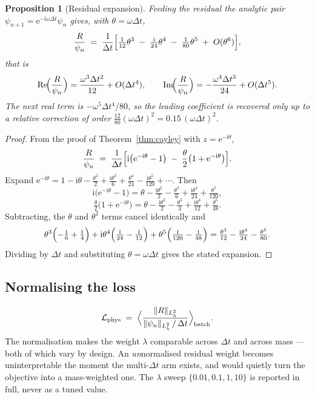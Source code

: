 \documentclass[11pt,a4paper]{article}
\theoremstyle{plain}
\newtheorem{proposition}[theorem]{Proposition}
\theoremstyle{definition}
\theoremstyle{remark}
\newcommand{\iu}{\mathrm{i}}
\newcommand{\eu}{\mathrm{e}}
\newcommand{\dt}{\Delta t}
\DeclareMathOperator{\Imag}{Im}
\DeclareMathOperator{\Real}{Re}
\begin{document}
\begin{proposition}[Residual expansion]
\label{prop:residualexpansion}
Feeding the residual the \emph{analytic} pair $\psi_{n+1} = \eu^{-\iu\omega\dt}\psi_n$
gives, with $\theta = \omega\dt$,
\[
\frac{R}{\psi_n}
\;=\; \frac{1}{\dt}\Bigl[\tfrac{1}{12}\theta^3 \;-\; \tfrac{\iu}{24}\theta^4 \;-\; \tfrac{1}{80}\theta^5 \;+\; O(\theta^6)\Bigr],
\]
that is
\[
\Real\!\Bigl(\frac{R}{\psi_n}\Bigr) = \frac{\omega^3\dt^2}{12} + O(\dt^4),
\qquad
\Imag\!\Bigl(\frac{R}{\psi_n}\Bigr) = -\frac{\omega^4\dt^3}{24} + O(\dt^5).
\]
The next real term is $-\omega^5\dt^4/80$, so the leading coefficient is recovered only up
to a \emph{relative} correction of order $\tfrac{12}{80}(\omega\dt)^2 = 0.15\,(\omega\dt)^2$.
\end{proposition}

\begin{proof}
From the proof of Theorem~\ref{thm:cayley} with $z=\eu^{-\iu\theta}$,
\[
\frac{R}{\psi_n}\;=\;\frac{1}{\dt}\Bigl[\iu\bigl(\eu^{-\iu\theta}-1\bigr) \;-\; \frac{\theta}{2}\bigl(1+\eu^{-\iu\theta}\bigr)\Bigr].
\]
Expand $\eu^{-\iu\theta} = 1 - \iu\theta - \tfrac{\theta^2}{2} + \tfrac{\iu\theta^3}{6} + \tfrac{\theta^4}{24} - \tfrac{\iu\theta^5}{120}+\cdots$. Then
\[
\iu\bigl(\eu^{-\iu\theta}-1\bigr) = \theta - \tfrac{\iu\theta^2}{2} - \tfrac{\theta^3}{6} + \tfrac{\iu\theta^4}{24} + \tfrac{\theta^5}{120},
\]
\[
\tfrac{\theta}{2}\bigl(1+\eu^{-\iu\theta}\bigr) = \theta - \tfrac{\iu\theta^2}{2} - \tfrac{\theta^3}{4} + \tfrac{\iu\theta^4}{12} + \tfrac{\theta^5}{48}.
\]
Subtracting, the $\theta$ and $\theta^2$ terms cancel identically and
\[
\theta^3\Bigl(-\tfrac16+\tfrac14\Bigr) + \iu\theta^4\Bigl(\tfrac1{24}-\tfrac1{12}\Bigr) + \theta^5\Bigl(\tfrac1{120}-\tfrac1{48}\Bigr)
= \tfrac{\theta^3}{12} - \tfrac{\iu\theta^4}{24} - \tfrac{\theta^5}{80}.
\]
Dividing by $\dt$ and substituting $\theta = \omega\dt$ gives the stated expansion.
\end{proof}

\subsection{Normalising the loss}

\[
\mathcal{L}_{\mathrm{phys}} \;=\; \Bigl\langle \frac{\|R\|_{L^2_h}}{\|\psi_n\|_{L^2_h}\,/\,\dt}\Bigr\rangle_{\text{batch}} .
\]
The normalisation makes the weight $\lambda$ comparable across $\dt$ and across mass ---
both of which vary by design. An \emph{un}normalised residual weight becomes
uninterpretable the moment the multi-$\dt$ arm exists, and would quietly turn the
objective into a mass-weighted one. The $\lambda$ sweep $\{0.01,0.1,1,10\}$ is reported in
full, never as a tuned value.
\end{document}
